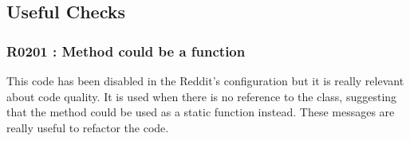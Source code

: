 \documentclass[11pt, a4paper]{article}
\begin{document}
\subsection*{Useful Checks}

\subsubsection*{R0201 : Method could be a function}

This code has been disabled in the Reddit's configuration but it is really relevant about code quality. 
It is used when there is no reference to the class, suggesting that the method could be used as a static function instead.
These messages are really useful to refactor the code.
\end{document}
